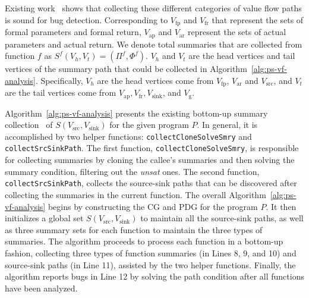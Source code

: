 Existing work~\cite{shi2020conquering,shi2018pinpoint} shows that collecting these different categories of value flow paths is sound for bug detection.
Corresponding to $V_{\text{fp}}$ and ${V}_{\text{fr}}$ that represent the sets of formal parameters and formal return,
${V}_{\text{ap}}$ and ${V}_{\text{ar}}$ represent the sets of actual parameters and actual return.
We denote total summaries that are collected from function $f$ as $S^{f}(V_{h}, V_{t})=(\Pi^{f}, \Phi^{f})$.
$V_{h}$ and $V_{t}$ are the head vertices and tail vertices of the summary path that could be collected in Algorithm~\ref{alg:ps-vf-analysis}.
Specifically, $V_{h}$ are the head vertices come from $V_{\text{fp}}$, $V_{\text{ar}}$ and $V_{\text{src}}$, and $V_{t}$ are the tail vertices come from $V_{\text{ap}}, V_{\text{fr}}, V_{\text{sink}}$, and $V_{\text{g}}$.

Algorithm~\ref{alg:ps-vf-analysis} presents the existing bottom-up summary collection~\cite{cousot2002modular, xie2005scalable, shi2018pinpoint, shi2020conquering, shi2020pipelining, shi2021path} of $ S(V_{\text{src}}, V_{\text{sink}})$ for the given program $P$. 
In general, it is accomplished by two helper functions: \texttt{collectCloneSolveSmry} and \texttt{collectSrcSinkPath}. 
The first function, \texttt{collectCloneSolveSmry}, is responsible for collecting summaries by cloning the callee's summaries and then solving the summary condition, filtering out the \textit{unsat} ones.
The second function, \texttt{collectSrcSinkPath}, collects the source-sink paths that can be discovered after collecting the summaries in the current function.
The overall Algorithm~\ref{alg:ps-vf-analysis} begins by constructing the CG and PDG for the program $P$. 
It then initializes a global set $S(V_{\text{src}}, V_{\text{sink}})$ to maintain all the source-sink paths, as well as three summary sets for each function to maintain the three types of summaries. 
The algorithm proceeds to process each function in a bottom-up fashion, collecting three types of function summaries (in Lines 8, 9, and 10) and source-sink paths (in Line 11), assisted by the two helper functions.
Finally, the algorithm reports bugs in Line 12 by solving the path condition after all functions have been analyzed.

